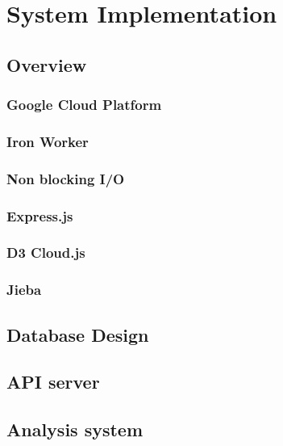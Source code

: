 \chapter{System Implementation}\label{cha:Implementation}

\section{Overview}

\subsection{Google Cloud Platform}

\subsection{Iron Worker}

\subsection{Non blocking I/O}

\subsection{Express.js}

\subsection{D3 Cloud.js}

\subsection{Jieba}

\section{Database Design}

\section{API server}
\section{Analysis system}
